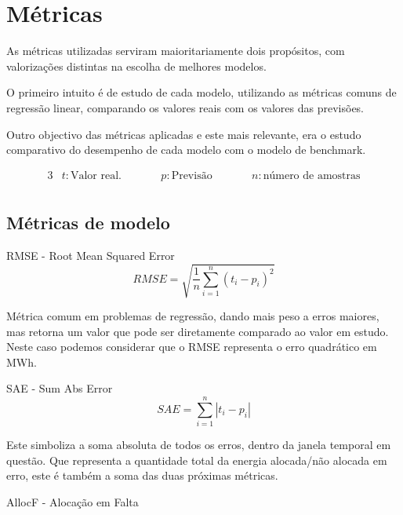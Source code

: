 \section{Métricas}

As métricas utilizadas serviram maioritariamente dois propósitos, com valorizações distintas na escolha de melhores modelos.\par
O primeiro intuito é de estudo de cada modelo, utilizando as métricas comuns de regressão linear, comparando os valores reais com os valores das previsões.\par
Outro objectivo das métricas aplicadas e este mais relevante, era o estudo comparativo do desempenho de cada modelo com o modelo de benchmark.\par

\begin{alignat*}{3} 
& t : \text{Valor real.} &\qquad& p : \text{Previsão} &\qquad& n : \text{número de amostras} \\
\end{alignat*}


\subsection{Métricas de modelo}

\bigskip
RMSE - Root Mean Squared Error \\

\begin{equation} \label{eq:rmse} 
    RMSE = \sqrt{\frac{1}{n} \sum_{i=1}^{n}(t_i - p_i)^2} 
\end{equation}
\smallskip

Métrica comum em problemas de regressão, dando mais peso a erros maiores, mas retorna um valor que pode ser diretamente comparado ao valor em estudo. Neste caso podemos considerar que o RMSE representa o erro quadrático em MWh.\par
\bigskip
SAE - Sum Abs Error \\


\begin{equation} \label{eq:sae} 
    SAE = \sum_{i=1}^{n}\left|t_i - p_i \right|
\end{equation}
\smallskip

Este simboliza a soma absoluta de todos os erros, dentro da janela temporal em questão. Que representa a quantidade total da energia alocada/não alocada em erro, este é também a soma das duas próximas métricas.\par
\bigskip
AllocF - Alocação em Falta \\

